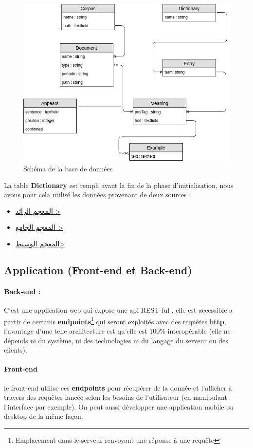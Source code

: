 \documentclass[]{report}
\begin{document}
			\begin{figure}[H]
				\centering
				\includegraphics[width=0.65\linewidth]{images/db_schema.png}
				\caption{Schéma de la base de données }
			\end{figure}
		
			\par
			La table \textbf{Dictionary} est rempli avant la fin de la phase d'initialisation, nous avons pour cela utilisé les données provenant de deux sources : 
			\begin{itemize}
				\item \href{http://waqfeya.com/book.php?bid=6116}{\<المعجم الرائد >}
				\item \href{https://www.almaany.com/ar/dict/ar-ar/}{\<المعجم الجامع >}
				\item \href{http://waqfeya.com/book.php?bid=210}{\<المعجم الوسيط> }
			\end{itemize}
			
		\subsection{Application (Front-end et Back-end)}	
			\paragraph{Back-end :}
			C'est une application web qui expose une api REST-ful , elle est accessible a partir de certains \textbf{endpoints}\footnote{Emplacement dans le serveur renvoyant une réponse à une requête } qui seront exploités avec
			des requêtes \textbf{http}, l'avantage d'une telle architecture est qu'elle est 100\% interopérable 
			(elle ne dépends ni du système, ni des technologies ni du langage du serveur ou des clients).
			\paragraph{Front-end}
			le front-end utilise ces \textbf{endpoints} pour récupérer de la donnée et l'afficher à travers des requêtes lancée selon les besoins de l'utilisateur (en manipulant l'interface par exemple).
			On peut aussi développer une application mobile ou desktop de la même façon.   	
\end{document}
